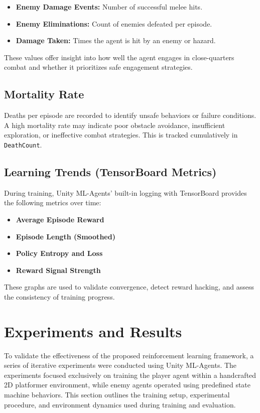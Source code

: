 \documentclass[12pt,oneside,openright,a4paper]{cpe-english-project}
\begin{document}
\begin{itemize}
\item \textbf{Enemy Damage Events:} Number of successful melee hits.
\item \textbf{Enemy Eliminations:} Count of enemies defeated per episode.
\item \textbf{Damage Taken:} Times the agent is hit by an enemy or hazard.
\end{itemize}

These values offer insight into how well the agent engages in close-quarters combat and whether it prioritizes safe engagement strategies.

\subsection{Mortality Rate}
Deaths per episode are recorded to identify unsafe behaviors or failure conditions. A high mortality rate may indicate poor obstacle avoidance, insufficient exploration, or ineffective combat strategies. This is tracked cumulatively in \texttt{DeathCount}.

\subsection{Learning Trends (TensorBoard Metrics)}

During training, Unity ML-Agents’ built-in logging with TensorBoard provides the following metrics over time:

\begin{itemize}
\item \textbf{Average Episode Reward}
\item \textbf{Episode Length (Smoothed)}
\item \textbf{Policy Entropy and Loss}
\item \textbf{Reward Signal Strength}
\end{itemize}

These graphs are used to validate convergence, detect reward hacking, and assess the consistency of training progress.

\section{Experiments and Results}

To validate the effectiveness of the proposed reinforcement learning framework, a series of iterative experiments were conducted using Unity ML-Agents. The experiments focused exclusively on training the player agent within a handcrafted 2D platformer environment, while enemy agents operated using predefined state machine behaviors. This section outlines the training setup, experimental procedure, and environment dynamics used during training and evaluation.
\end{document}
